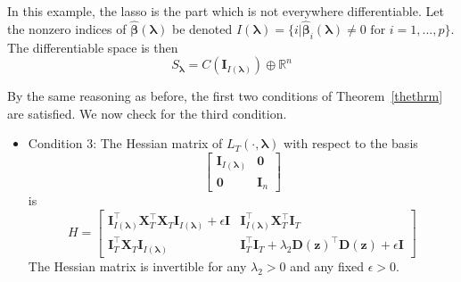 \documentclass[10pt,letterpaper]{article}
\begin{document}
In this example, the lasso is the part which is not everywhere differentiable. Let the nonzero indices of $\hat{\boldsymbol{\beta}}(\boldsymbol\lambda)$ be denoted $I(\boldsymbol\lambda) = \{i | \hat{\boldsymbol{\beta}}_i(\boldsymbol\lambda) \ne 0 \text{ for } i=1,...,p \}$. The differentiable space is then
\begin{equation}
S_{\boldsymbol{\lambda}} = C(\boldsymbol I_{I(\boldsymbol\lambda)}) \oplus \mathbb{R}^n
\end{equation}

By the same reasoning as before, the first two conditions of Theorem~\ref{thethrm} are satisfied. We now check for the third condition.
\begin{itemize}
\item[] Condition 3: The Hessian matrix of $L_T(\cdot, \boldsymbol{\lambda})$ with respect to the basis 
\begin{equation}
\begin{bmatrix}
\boldsymbol I_{I(\boldsymbol\lambda)} & \boldsymbol 0\\
\boldsymbol 0 & \boldsymbol I_n
\end{bmatrix}
\label{eq:aplmbasis}
\end{equation}
is
\begin{equation}
H =
\begin{bmatrix}
\boldsymbol I_{I(\boldsymbol \lambda)}^\top \boldsymbol X_T^\top \boldsymbol X_T \boldsymbol I_{I(\boldsymbol \lambda)} + \epsilon \boldsymbol I
&  \boldsymbol I_{I(\boldsymbol \lambda)}^\top \boldsymbol X_T^\top \boldsymbol I_T \\
\boldsymbol I_T^\top \boldsymbol X_T \boldsymbol I_{I(\boldsymbol \lambda)} &
\boldsymbol I_T^\top \boldsymbol{I}_T + \lambda_2 \boldsymbol{D}(\boldsymbol{z})^\top \boldsymbol{D}(\boldsymbol{z}) + \epsilon \boldsymbol I
\end{bmatrix}
\end{equation}
The Hessian matrix is invertible for any $\lambda_2 > 0$ and any fixed $\epsilon > 0$.
\end{itemize}
\end{document}
